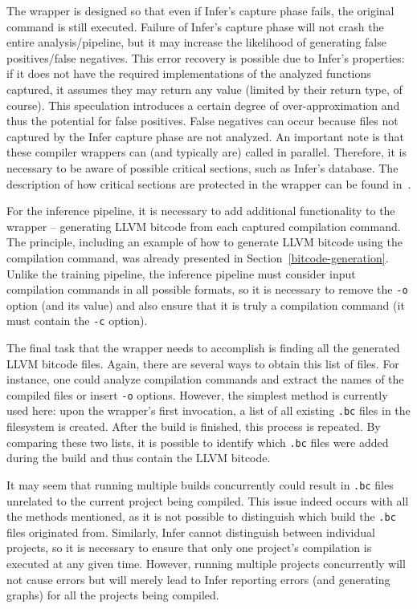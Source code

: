 The wrapper is designed so that even if Infer's capture phase fails, the original command is still executed. Failure of Infer's capture phase will not crash the entire analysis/pipeline, but it may increase the likelihood of generating false positives/false negatives. This error recovery is possible due to Infer's properties: if it does not have the required implementations of the analyzed functions captured, it assumes they may return any value (limited by their return type, of course). This speculation introduces a certain degree of over-approximation and thus the potential for false positives. False negatives can occur because files not captured by the Infer capture phase are not analyzed. An important note is that these compiler wrappers can (and typically are) called in parallel. Therefore, it is necessary to be aware of possible critical sections, such as Infer's database. The description of how critical sections are protected in the wrapper can be found in~\cite{bc}.

For the inference pipeline, it is necessary to add additional functionality to the wrapper -- generating LLVM bitcode from each captured compilation command. The principle, including an example of how to generate LLVM bitcode using the compilation command, was already presented in Section~\ref{bitcode-generation}. Unlike the training pipeline, the inference pipeline must consider input compilation commands in all possible formats, so it is necessary to remove the \texttt{-o} option (and its value) and also ensure that it is truly a compilation command (it must contain the \texttt{-c} option).

The final task that the wrapper needs to accomplish is finding all the generated LLVM bitcode files. Again, there are several ways to obtain this list of files. For instance, one could analyze compilation commands and extract the names of the compiled files or insert \texttt{-o} options. However, the simplest method is currently used here: upon the wrapper's first invocation, a list of all existing \texttt{.bc} files in the filesystem is created. After the build is finished, this process is repeated. By comparing these two lists, it is possible to identify which \texttt{.bc} files were added during the build and thus contain the LLVM bitcode.

It may seem that running multiple builds concurrently could result in \texttt{.bc} files unrelated to the current project being compiled. This issue indeed occurs with all the methods mentioned, as it is not possible to distinguish which build the \texttt{.bc} files originated from. Similarly, Infer cannot distinguish between individual projects, so it is necessary to ensure that only one project's compilation is executed at any given time. However, running multiple projects concurrently will not cause errors but will merely lead to Infer reporting errors (and generating graphs) for all the projects being compiled.

